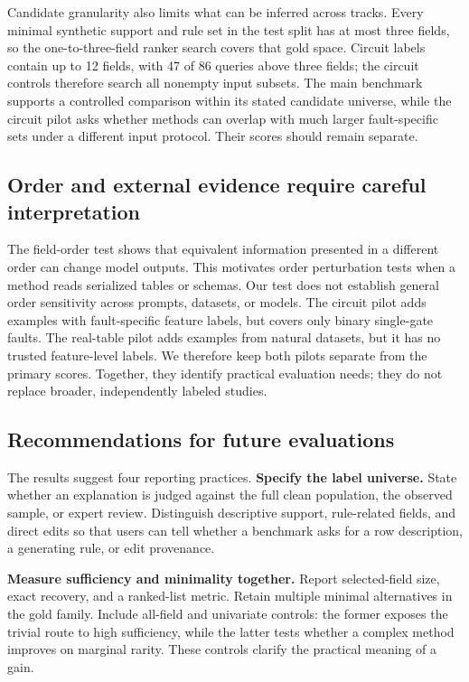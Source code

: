\documentclass[conference]{IEEEtran}
\begin{document}
Candidate granularity also limits what can be inferred across tracks. Every minimal synthetic support and rule set in the test split has at most three fields, so the one-to-three-field ranker search covers that gold space. Circuit labels contain up to 12 fields, with 47 of 86 queries above three fields; the circuit controls therefore search all nonempty input subsets. The main benchmark supports a controlled comparison within its stated candidate universe, while the circuit pilot asks whether methods can overlap with much larger fault-specific sets under a different input protocol. Their scores should remain separate.

\subsection{Order and external evidence require careful interpretation}
The field-order test shows that equivalent information presented in a different order can change model outputs. This motivates order perturbation tests when a method reads serialized tables or schemas. Our test does not establish general order sensitivity across prompts, datasets, or models. The circuit pilot adds examples with fault-specific feature labels, but covers only binary single-gate faults. The real-table pilot adds examples from natural datasets, but it has no trusted feature-level labels. We therefore keep both pilots separate from the primary scores. Together, they identify practical evaluation needs; they do not replace broader, independently labeled studies.

\subsection{Recommendations for future evaluations}
The results suggest four reporting practices. \textbf{Specify the label universe.} State whether an explanation is judged against the full clean population, the observed sample, or expert review. Distinguish descriptive support, rule-related fields, and direct edits so that users can tell whether a benchmark asks for a row description, a generating rule, or edit provenance.

\textbf{Measure sufficiency and minimality together.} Report selected-field size, exact recovery, and a ranked-list metric. Retain multiple minimal alternatives in the gold family. Include all-field and univariate controls: the former exposes the trivial route to high sufficiency, while the latter tests whether a complex method improves on marginal rarity. These controls clarify the practical meaning of a gain.
\end{document}
